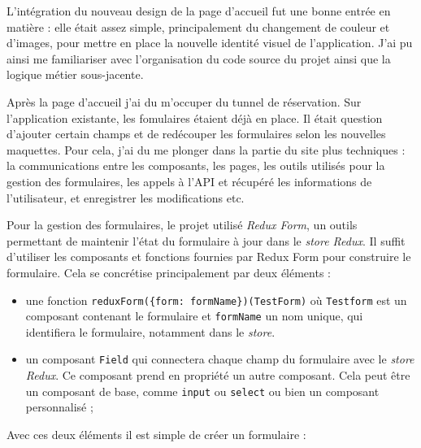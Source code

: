 \documentclass[12pt,a4paper]{article}
\providecommand{\tightlist}{%
  \setlength{\itemsep}{0pt}\setlength{\parskip}{0pt}}
\begin{document}
  \bigskip

  L'intégration du nouveau design de la page d'accueil fut une bonne
  entrée en matière : elle était assez simple, principalement du
  changement de couleur et d'images, pour mettre en place la nouvelle
  identité visuel de l'application. J'ai pu ainsi me familiariser avec
  l'organisation du code source du projet ainsi que la logique métier
  sous-jacente.

  \bigskip

  Après la page d'accueil j'ai du m'occuper du tunnel de réservation. Sur
  l'application existante, les fomulaires étaient déjà en place. Il était
  question d'ajouter certain champs et de redécouper les formulaires selon
  les nouvelles maquettes. Pour cela, j'ai du me plonger dans la partie du
  site plus techniques : la communications entre les composants, les
  pages, les outils utilisés pour la gestion des formulaires, les appels à
  l'API et récupéré les informations de l'utilisateur, et enregistrer les
  modifications etc.

  \bigskip

  Pour la gestion des formulaires, le projet utilisé \emph{Redux Form}, un
  outils permettant de maintenir l'état du formulaire à jour dans le
  \emph{store Redux}. Il suffit d'utiliser les composants et fonctions
  fournies par Redux Form pour construire le formulaire. Cela se
  concrétise principalement par deux éléments :

  \begin{itemize}
  \tightlist
  \item
    une fonction
    \texttt{reduxForm(\{form:\ \textquotesingle{}formName\textquotesingle{}\})(TestForm)}
    où \texttt{Testform} est un composant contenant le formulaire et
    \texttt{formName} un nom unique, qui identifiera le formulaire,
    notamment dans le \emph{store}.
  \item
    un composant \texttt{Field} qui connectera chaque champ du formulaire
    avec le \emph{store Redux}. Ce composant prend en propriété un autre
    composant. Cela peut être un composant de base, comme \texttt{input}
    ou \texttt{select} ou bien un composant personnalisé ;
  \end{itemize}

  Avec ces deux éléments il est simple de créer un formulaire :
\end{document}
